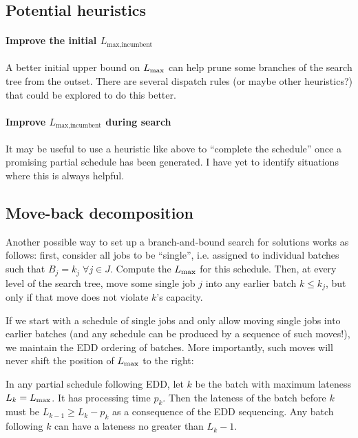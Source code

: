 \subsection{Potential heuristics}
\paragraph{Improve the initial $L_{\text{max,incumbent}}$} A better initial
upper bound on $L_{\text{max}}$ can help prune some branches of the search tree from the
outset. There are several dispatch rules (or maybe other heuristics?) that could
be explored to do this better.
\paragraph{Improve $L_{\text{max,incumbent}}$ during search} It may be useful to
use a heuristic like above to ``complete the schedule'' once a promising partial
schedule has been generated. I have yet to identify situations where this is
always helpful.

\subsection{Move-back decomposition}

Another possible way to set up a branch-and-bound search for solutions works as
follows: first, consider all jobs to be ``single'', i.e. assigned to individual
batches such that $B_j = k_j \; \forall j \in J$. Compute the $L_{\text{max}}$ for this
schedule. Then, at every level of the search tree, move some single job $j$ into any
earlier batch $k \leq k_j$, but only if that move does not violate $k$'s
capacity. 

If we start with a schedule of single jobs and only allow moving single jobs
into earlier batches (and any schedule can be produced by a sequence of such
moves!), we maintain the EDD ordering of batches. More importantly, such moves
will never shift the position of $L_{\text{max}}$ to the right:

In any partial schedule following EDD, let $k$ be the batch
with maximum lateness $L_k = L_{\text{max}}$. It has processing time $p_k$. Then the lateness of the
batch before $k$ must be $L_{k-1} \geq L_k - p_k$ as a consequence of the EDD
sequencing. Any batch following $k$ can have a lateness no greater than $L_k -
1$.

